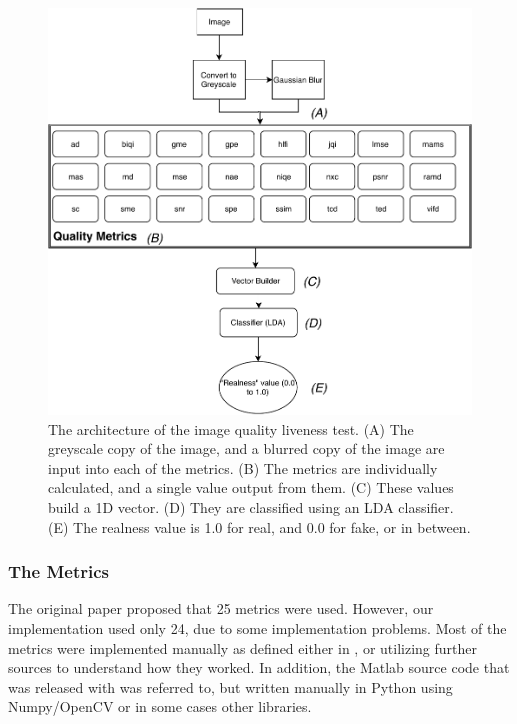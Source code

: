 \documentclass[10pt,a4paper]{article}
\begin{document}
            \begin{figure}
                \centering
                \includegraphics[width=\linewidth]{ImageQualityLivenessTest.pdf}
                \caption{The architecture of the image quality liveness test. (A) The greyscale copy of the image, and a blurred copy of the image are input into each of the metrics.
                (B) The metrics are individually calculated, and a single value output from them. (C) These values build a 1D vector. (D) They are classified using an LDA classifier. (E) The realness value
                is 1.0 for real, and 0.0 for fake, or in between.}
                \label{ImageQualityLivenessTestDiagram}
            \end{figure}
    
            \subsubsection{The Metrics}
            The original paper proposed that 25 metrics were used. However, our implementation used only 24, due to some implementation problems. Most of the metrics were implemented manually as defined
            either in \cite{ImageQualityAssessmentTest}, or utilizing further sources to understand how they worked. In addition, the Matlab source code that was released with \cite{ImageQualityAssessmentTest}
            was referred to, but written manually in Python using Numpy/OpenCV or in some cases other libraries.
\end{document}
